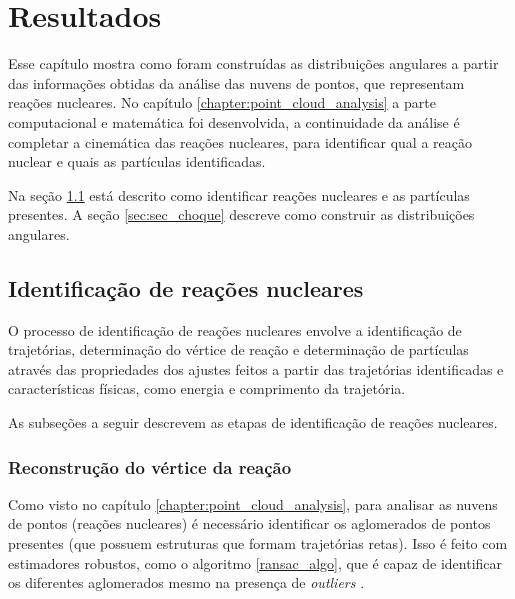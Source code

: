 \documentclass[a4paper,12pt,oneside]{book}
\begin{document}
\chapter{Resultados}\label{chapter:resultados}

\par Esse capítulo mostra como foram construídas as distribuições angulares a partir das informações obtidas da análise das nuvens de pontos, que representam reações nucleares. No capítulo \ref{chapter:point_cloud_analysis} a parte computacional e matemática foi desenvolvida, a continuidade da análise é completar a cinemática das reações nucleares, para identificar qual a reação nuclear e quais as partículas identificadas. 

\par Na seção \ref{sec:identif_reac_nucl} está descrito como identificar reações nucleares e as partículas presentes. A seção \ref{sec:sec_choque} descreve como construir as distribuições angulares.

\section{Identificação de reações nucleares}\label{sec:identif_reac_nucl}

\par O processo de identificação de reações nucleares envolve a identificação de trajetórias, determinação do vértice de reação e determinação de partículas através das propriedades dos ajustes feitos a partir das trajetórias identificadas e características físicas, como energia  e comprimento da trajetória.

\par As subseções a seguir descrevem as etapas de identificação de reações nucleares.

\subsection{Reconstrução do vértice da reação}

\par Como visto no capítulo \ref{chapter:point_cloud_analysis}, para analisar as nuvens de pontos (reações nucleares) é necessário identificar os aglomerados de pontos presentes (que possuem estruturas que formam trajetórias retas). Isso é feito com estimadores robustos, como o algoritmo \ref{ransac_algo}, que é capaz de identificar os diferentes aglomerados mesmo na presença de \textit{outliers} \cite{artigo}.
\end{document}
